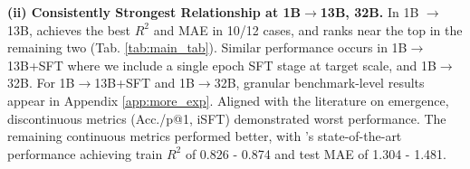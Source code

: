 \textbf{(ii) Consistently Strongest Relationship at 1B$\rightarrow$13B, 32B.} In 1B $\rightarrow$13B,  achieves the best $R^2$ and MAE in 10/12 cases, and ranks near the top in the remaining two (Tab. \ref{tab:main_tab}). Similar performance occurs in 1B$\rightarrow$13B+SFT where we include a single epoch SFT stage at target scale, and 1B$\rightarrow$32B. For 1B$\rightarrow$13B+SFT and 1B$\rightarrow$32B, granular benchmark-level results appear in Appendix \ref{app:more_exp}.  Aligned with the literature on emergence, discontinuous metrics (Acc./p@1, iSFT) demonstrated worst performance. The remaining continuous metrics performed better, with 's state-of-the-art performance achieving train $R^2$ of 0.826 - 0.874 and test MAE of 1.304 - 1.481.
\begin{table}[bt!]
\centering
{}
\end{table}
